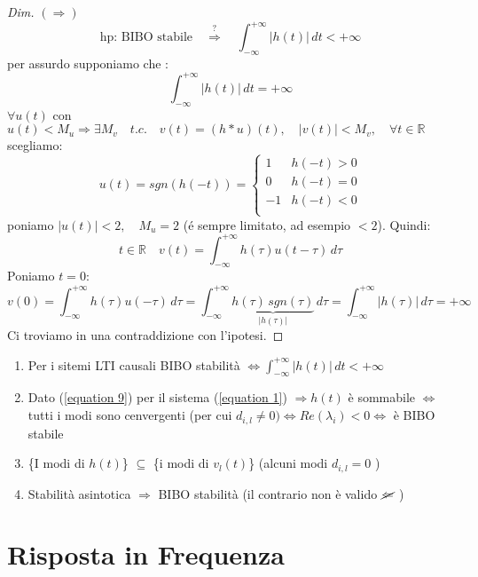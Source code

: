 \begin{proof}[Dim]
	\emph{$(\Rightarrow)$}
	\[
		\text{hp: BIBO stabile} \quad \overset{?}{\Rightarrow} \quad \int_{-\infty}^{+\infty}\lvert h(t) \rvert \,dt < +\infty
	\]
	per assurdo supponiamo che :
	\[
		\int_{-\infty}^{+\infty}\lvert h(t) \rvert \,dt = +\infty
	\]
	$\forall u(t)$ con $u(t)<M_u \Rightarrow \exists M_v \quad t.c. \quad v(t) = (h*u)(t), \quad \lvert v(t) \rvert < M_v , \quad \forall t \in \mathbb{R} \quad$scegliamo:
	\[
		u(t) = sgn(h(-t)) = \begin{cases}
			1 &h(-t)>0\\
			0 &h(-t)=0\\
			-1 &h(-t)<0\\
		\end{cases}
	\]
	poniamo $\lvert u(t)\rvert <2,\quad M_u = 2$ (é sempre limitato, ad esempio $<2$). %
	Quindi:
	\[
		t \in \mathbb{R}\quad v(t) = \int_{-\infty}^{+\infty}h(\tau)u(t-\tau)\,d\tau 
	\]
	Poniamo $t=0$:
	\[
		v(0) = \int_{-\infty}^{+\infty}h(\tau)u(-\tau)\,d\tau 
		= \int_{-\infty}^{+\infty}\underbrace{h(\tau)\, sgn(\tau)}_{\lvert h(\tau)\rvert}\,d\tau %
		= \int_{-\infty}^{+\infty}\lvert h(\tau) \rvert \,d\tau = +\infty
	\]
	Ci troviamo in una contraddizione con l'ipotesi.
\end{proof}

\begin{osservazione}\leavevmode
	\begin{enumerate}
		\item Per i sitemi LTI causali BIBO stabilità $\Leftrightarrow \int_{-\infty}^{+\infty}\lvert h(t) \rvert \,dt < +\infty$
		\item Dato (\ref{equation 9}) per il sistema (\ref{equation 1})	$\Rightarrow h(t) $ è sommabile $\Leftrightarrow$ tutti i modi sono cenvergenti (per cui $d_{i,l}\ne0)\Leftrightarrow Re(\lambda_i)<0 \Leftrightarrow $ è BIBO stabile
		\item \{I modi di $h(t)$\} $\subseteq$ \{i modi di $v_l(t)$\} (alcuni modi $d_{i,l}=0$ )
		\item  Stabilità asintotica $\Rightarrow$ BIBO stabilità (il contrario non è valido $\cancel{\Leftarrow}$ )
	\end{enumerate}
\end{osservazione}


\section{Risposta in Frequenza}

